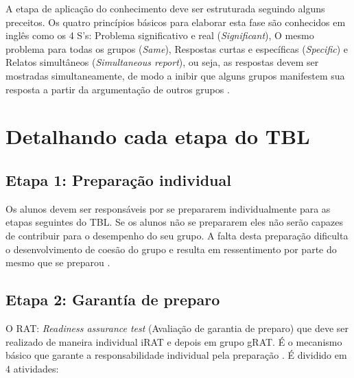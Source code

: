 A etapa de aplicação do conhecimento deve ser estruturada seguindo alguns preceitos. Os quatro princípios básicos para elaborar esta fase são conhecidos em inglês como os 4 S’s: Problema significativo e real (\textit{Significant}), O mesmo problema para todas os grupos (\textit{Same}), Respostas curtas e específicas (\textit{Specific}) e Relatos simultâneos (\textit{Simultaneous report}), ou seja, as respostas devem ser mostradas simultaneamente, de modo a inibir que alguns grupos manifestem sua resposta a partir da argumentação de outros grupos \cite{sweet}.

\section{Detalhando cada etapa do TBL}

\subsection{Etapa 1: Preparação individual}

Os alunos devem ser responsáveis por se prepararem individualmente para as etapas seguintes do TBL. Se os alunos não se prepararem eles não serão capazes de contribuir para o desempenho do seu grupo. A falta desta preparação dificulta o desenvolvimento de coesão do grupo e resulta em ressentimento por parte do mesmo que se preparou \cite{sweet}.

\subsection{Etapa 2: Garantía de preparo}

O RAT: \textit{Readiness assurance test} (Avaliação de garantia de preparo) que deve ser realizado de maneira individual iRAT e depois em grupo gRAT. É o mecanismo básico que garante a responsabilidade individual pela preparação \cite{sweet}. É dividido em 4 atividades:


